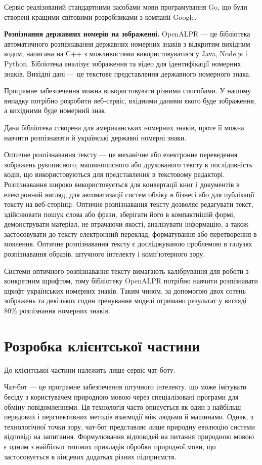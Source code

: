 Сервіс реалізований стандартними засобами мови програмування Go,
що були створені кращими світовими розробниками з компанії Google.

\textbf{Розпізнання державних номерів на зображенні.}
OpenALPR — це бібліотека автоматичного розпізнавання
державних номерних знаків з відкритим вихідним кодом,
написана на C++ з можливостями використовуватися у Java, Node.js і Python.
Бібліотека аналізує зображення та відео для ідентифікації номерних знаків.
Вихідні дані — це текстове представлення державного номерного знака.

Програмне забезпечення можна використовувати різними способами.
У нашому випадку потрібно розробити веб-сервіс, вхідними даними якого буде зображення, а
вихідними буде номерний знак.

Дана бібліотека створена для американських номерних знаків,
проте її можна навчити розпізнавати й українські державні номерні знаки.

Оптичне розпізнавання тексту — це механічне або електронне переведення
зображень рукописного, машинописного або друкованого тексту в послідовність
кодів, що використовуються для представлення в текстовому редакторі.
Розпізнавання широко використовується для конвертації книг і документів
в електронний вигляд, для автоматизації систем обліку в бізнесі або
для публікації тексту на веб-сторінці.
Оптичне розпізнавання тексту дозволяє редагувати текст,
здійснювати пошук слова або фрази, зберігати його в компактнішій формі,
демонструвати матеріал, не втрачаючи якості,
аналізувати інформацію, а також застосовувати до тексту електронний переклад,
форматування або перетворення в мовлення.
Оптичне розпізнавання тексту є досліджуваною проблемою в галузях розпізнавання образів,
штучного інтелекту і комп'ютерного зору.

Системи оптичного розпізнавання тексту вимагають калібрування для
роботи з конкретним шрифтом, тому бібліотеку OpenALPR потрібно
навчити розпізнавати шрифт українських номерних знаків.
Таким чином, за допомогою двох сотень зображень та декількох
годин тренування моделі отримано результат у вигляді 80\%
розпізнання номерних знаків.

\section{Розробка клієнтської частини}

До клієнтської частини належить лише сервіс чат-боту.

Чат-бот — це програмне забезпечення штучного інтелекту, що може імітувати бесіду з користувачем природною мовою через спеціалізовані програми для обміну повідомленнями.
Ця технологія часто описується як один з найбільш передових і перспективних
методів взаємодії між людьми й машинами.
Однак, з технологічної точки зору, чат-бот представляє лише природну
еволюцію системи відповіді на запитання.
Формулювання відповідей на питання природною мовою є одним з найбільш
типових прикладів обробки природної мови, що застосовується в кінцевих
додатках різних підприємств.

